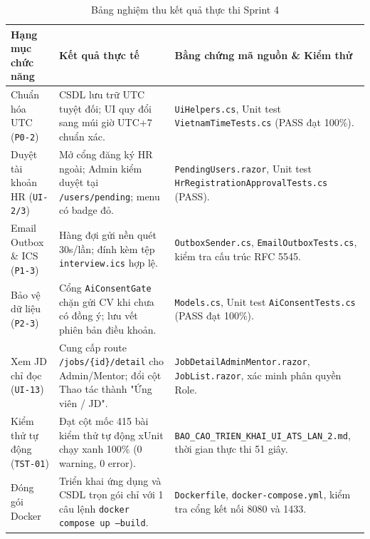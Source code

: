 \begin{table}[htbp]
\centering
\small
\caption{Bảng nghiệm thu kết quả thực thi Sprint 4}
\label{tab:sprint4-results}
\begin{tabularx}{\textwidth}{p{3.2cm} p{3.8cm} X}
\toprule
\textbf{Hạng mục chức năng} & \textbf{Kết quả thực tế} & \textbf{Bằng chứng mã nguồn \& Kiểm thử} \\
\midrule
Chuẩn hóa UTC (\texttt{P0-2}) & CSDL lưu trữ UTC tuyệt đối; UI quy đổi sang múi giờ UTC+7 chuẩn xác. & \texttt{UiHelpers.cs}, Unit test \texttt{VietnamTimeTests.cs} (PASS đạt 100\%). \\
\addlinespace
Duyệt tài khoản HR (\texttt{UI-2/3}) & Mở cổng đăng ký HR ngoài; Admin kiểm duyệt tại \texttt{/users/pending}; menu có badge đỏ. & \texttt{PendingUsers.razor}, Unit test \texttt{HrRegistrationApprovalTests.cs} (PASS). \\
\addlinespace
Email Outbox \& ICS (\texttt{P1-3}) & Hàng đợi gửi nền quét 30s/lần; đính kèm tệp \texttt{interview.ics} hợp lệ. & \texttt{OutboxSender.cs}, \texttt{EmailOutboxTests.cs}, kiểm tra cấu trúc RFC 5545. \\
\addlinespace
Bảo vệ dữ liệu (\texttt{P2-3}) & Cổng \texttt{AiConsentGate} chặn gửi CV khi chưa có đồng ý; lưu vết phiên bản điều khoản. & \texttt{Models.cs}, Unit test \texttt{AiConsentTests.cs} (PASS đạt 100\%). \\
\addlinespace
Xem JD chỉ đọc (\texttt{UI-13}) & Cung cấp route \texttt{/jobs/\{id\}/detail} cho Admin/Mentor; đổi cột Thao tác thành "Ứng viên / JD". & \texttt{JobDetailAdminMentor.razor}, \texttt{JobList.razor}, xác minh phân quyền Role. \\
\addlinespace
Kiểm thử tự động (\texttt{TST-01}) & Đạt cột mốc 415 bài kiểm thử tự động xUnit chạy xanh 100\% (0 warning, 0 error). & \texttt{BAO\_CAO\_TRIEN\_KHAI\_UI\_ATS\_LAN\_2.md}, thời gian thực thi 51 giây. \\
\addlinespace
Đóng gói Docker & Triển khai ứng dụng và CSDL trọn gói chỉ với 1 câu lệnh \texttt{docker compose up --build}. & \texttt{Dockerfile}, \texttt{docker-compose.yml}, kiểm tra cổng kết nối 8080 và 1433. \\
\bottomrule
\end{tabularx}
\end{table}
